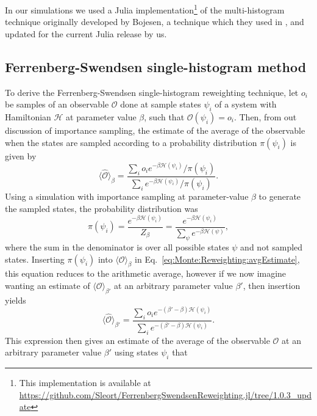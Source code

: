 In our simulations we used a Julia implementation\footnote{This implementation is available at
\url{https://github.com/Sleort/FerrenbergSwendsenReweighting.jl/tree/1.0.3_update}}
 of the multi-histogram technique originally developed by Bojesen, a technique which they used in \cite{Bojesen13M},
and updated for the current Julia release by us.

\subsection{Ferrenberg-Swendsen single-histogram method}

To derive the Ferrenberg-Swendsen single-histogram reweighting technique, let $o_i$ be samples of an observable $\mathcal{O}$ done at sample states $\psi_i$ of a system
with Hamiltonian $\mathcal{H}$ at parameter value $\beta$, such that $\mathcal{O}(\psi_i) = o_i$.
Then, from out discussion of importance sampling, the estimate of the average of the observable when the states are sampled
according to a probability distribution $\pi(\psi_i)$ is given by
\begin{equation}
    \label{eq:Monte:Reweighting:avgEstimate}
    \langle \hat{\mathcal{O}}\rangle_\beta = \frac{\sum_io_ie^{-\beta\mathcal{H}(\psi_i)}/\pi(\psi_i)}{\sum_ie^{-\beta\mathcal{H}(\psi_i)}/\pi(\psi_i)}.
\end{equation}
Using a simulation with importance sampling at parameter-value $\beta$ to generate the sampled states, the probability distribution was
\begin{equation}
    \label{eq:Monte:Reweighting:probDist}
    \pi(\psi_i) = \frac{e^{-\beta\mathcal{H}(\psi_i)}}{Z_\beta} = \frac{e^{-\beta\mathcal{H}(\psi_i)}}{\sum_\psi e^{-\beta\mathcal{H}(\psi)}},
\end{equation}
where the sum in the denominator is over all possible states $\psi$ and not sampled states. Inserting $\pi(\psi_i)$ into $\langle\mathcal{O}\rangle_\beta$
in Eq.~\eqref{eq:Monte:Reweighting:avgEstimate}, this equation reduces to the arithmetic average, however if we now imagine wanting an estimate of
$\langle\mathcal{O}\rangle_{\beta'}$ at an arbitrary parameter value $\beta'$, then insertion yields
\begin{equation}
    \label{eq:Monte:Reweighting:FS}
    \langle \hat{\mathcal{O}}\rangle_{\beta'} = \frac{\sum_io_ie^{-(\beta'-\beta)\mathcal{H}(\psi_i)}}{\sum_ie^{-(\beta'-\beta)\mathcal{H}(\psi_i)}}.
\end{equation}
This expression then gives an estimate of the average of the observable $\mathcal{O}$ at an arbitrary parameter value $\beta'$ using states $\psi_i$ that
